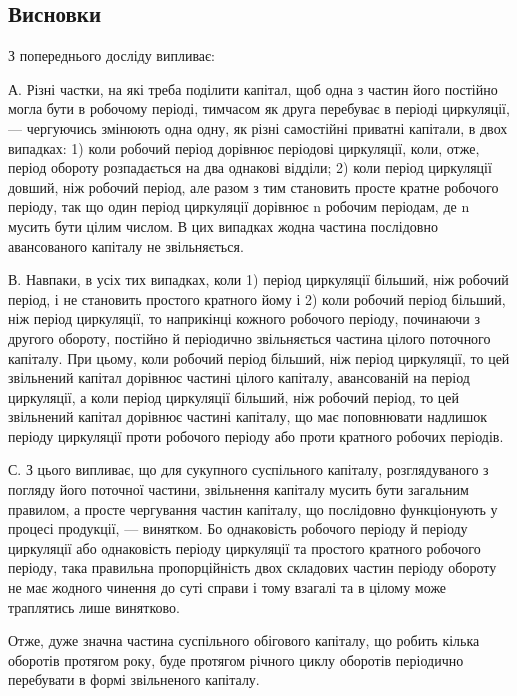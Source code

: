 \subsection{Висновки}

З попереднього досліду випливає:

А. Різні частки, на які треба поділити капітал, щоб одна з частин
його постійно могла бути в робочому періоді, тимчасом як друга перебуває
в періоді циркуляції, — чергуючись змінюють одна одну, як різні
самостійні приватні капітали, в двох випадках: 1) коли робочий період
дорівнює періодові циркуляції, коли, отже, період обороту розпадається
на два однакові відділи; 2) коли період циркуляції довший, ніж робочий
період, але разом з тим становить просте кратне робочого періоду, так
що один період циркуляції дорівнює n робочим періодам, де n мусить
бути цілим числом. В цих випадках жодна частина послідовно авансованого
капіталу не звільняється.

В. Навпаки, в усіх тих випадках, коли 1) період циркуляції більший,
ніж робочий період, і не становить простого кратного йому і 2) коли
робочий період більший, ніж період циркуляції, то наприкінці кожного
робочого періоду, починаючи з другого обороту, постійно й періодично
звільняється частина цілого поточного капіталу. При цьому, коли робочий
період більший, ніж період циркуляції, то цей звільнений капітал
дорівнює частині цілого капіталу, авансованій на період циркуляції, а
коли період циркуляції більший, ніж робочий період, то цей звільнений
капітал дорівнює частині капіталу, що має поповнювати надлишок періоду
циркуляції проти робочого періоду або проти кратного робочих періодів.

С. З цього випливає, що для сукупного суспільного капіталу, розглядуваного
з погляду його поточної частини, звільнення капіталу
мусить бути загальним правилом, а просте чергування частин капіталу,
що послідовно функціонують у процесі продукції, — винятком. Бо однаковість
робочого періоду й періоду циркуляції або однаковість періоду
циркуляції та простого кратного робочого періоду, така правильна пропорційність
двох складових частин періоду обороту не має жодного
чинення до суті справи і тому взагалі та в цілому може траплятись лише
винятково.

Отже, дуже значна частина суспільного обігового капіталу, що робить
кілька оборотів протягом року, буде протягом річного циклу оборотів
періодично перебувати в формі звільненого капіталу.

